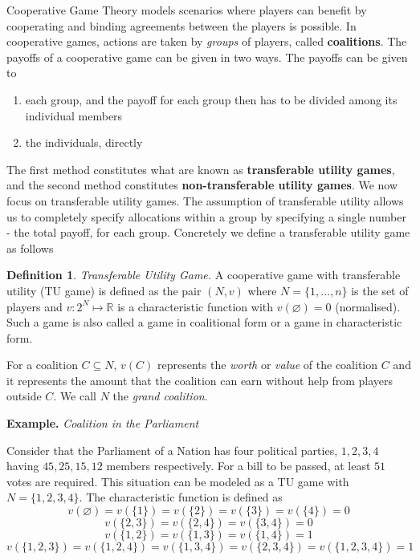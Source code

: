 \documentclass{article}
\theoremstyle{definition}
\newtheorem{defn}[theorem]{Definition}
\begin{document}
Cooperative Game Theory models scenarios where players can benefit by cooperating and binding agreements between the players is possible. In cooperative games, actions are taken by \textit{groups} of players, called \textbf{coalitions}. The payoffs of a cooperative game can be given in two ways. The payoffs can be given to
\begin{enumerate}
    \item each group, and the payoff for each group then has to be divided among its individual members
    \item the individuals, directly
\end{enumerate}
The first method constitutes what are known as \textbf{transferable utility games}, and the second method constitutes \textbf{non-transferable utility games}. We now focus on transferable utility games. The assumption of transferable utility allows us to completely specify allocations within a group by specifying a single number - the total payoff, for each group. Concretely we define a transferable utility game as follows
\begin{defn}
    \textit{Transferable Utility Game.} A cooperative game with transferable utility (TU game) is defined as the pair $(N,v)$ where $N = \{ 1, \ldots , n\}$ is the set of players and $v \colon 2^N \mapsto \mathbb{R}$ is a characteristic function with $v(\varnothing) = 0$ (normalised). Such a game is also called a game in coalitional form or a game in characteristic form.
\end{defn}

For a coalition $C \subseteq N$, $v(C)$ represents the \textit{worth} or \textit{value} of the coalition $C$ and it represents the amount that the coalition can earn without help from players outside $C$. We call $N$ the \textit{grand coalition}. \medskip

\textbf{Example.} \textit{Coalition in the Parliament} \smallskip

Consider that the Parliament of a Nation has four political parties, $1,2,3,4$ having $45, 25, 15, 12$ members respectively. For a bill to be passed, at least $51$ votes are required. This situation can be modeled as a TU game with $N = \{ 1,2,3,4 \}$. The characteristic function is defined as 
\[
    v\left( \varnothing \right) = v\left(\{1\}\right) = v\left(\{2\}\right) = v\left(\{3\}\right) = v\left(\{4\}\right) = 0 
\]
\[
    v\left(\{ 2,3 \}\right) = v\left(\{2,4\}\right) = v\left(\{3,4\}\right) = 0
\]
\[  
    v\left(\{ 1,2 \}\right) = v\left(\{1,3\}\right) = v\left(\{1,4\}\right) = 1 
\]  
\[
    v\left(\{ 1,2,3\}\right) = v\left( \{1,2,4\}\right) = v\left(\{1,3,4\}\right) = v\left(\{2,3,4\}\right) = v\left( \{1,2,3,4\}\right) = 1 
\]
\end{document}
